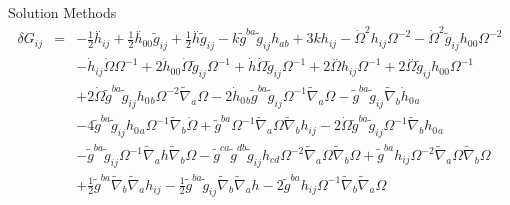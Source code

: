 \documentclass[8pt,aspectratio=1610]{beamer}
\begin{document}

\begin{frame}{Solution Methods}
	\begin{eqnarray}
		\delta G_{ij} &=& - \tfrac{1}{2} \overset{..}{h}_{ij} + \tfrac{1}{2} \overset{..}{h}_{00}{} \tilde{g}_{ij} + \tfrac{1}{2} \overset{..}{h} \tilde{g}_{ij} -  k \tilde{g}^{ba} \tilde{g}_{ij} h_{ab} + 3 k h_{ij} -  \dot{\Omega}^2 h_{ij} \Omega^{-2} -  \dot{\Omega}^2 \tilde{g}_{ij} h_{00}{} \Omega^{-2} 
		\nonumber\\
		&& -  \dot{h}_{ij} \dot{\Omega} \Omega^{-1}  + 2 \dot{h}_{00}{} \dot{\Omega} \tilde{g}_{ij} \Omega^{-1} + \dot{h} \dot{\Omega} \tilde{g}_{ij} \Omega^{-1} + 2 \overset{..}{\Omega} h_{ij} \Omega^{-1} + 2 \overset{..}{\Omega} \tilde{g}_{ij} h_{00}{} \Omega^{-1} 
		\nonumber\\
		&& + 2 \dot{\Omega} \tilde{g}^{ba} \tilde{g}_{ij} h_{0}{}_{b} \Omega^{-2} \tilde{\nabla}_{a}\Omega  - 2 \dot{h}_{0}{}_{b} \tilde{g}^{ba} \tilde{g}_{ij} \Omega^{-1} \tilde{\nabla}_{a}\Omega -  \tilde{g}^{ba} \tilde{g}_{ij} \tilde{\nabla}_{b}\dot{h}_{0}{}_{a} 
		\nonumber\\
		&& - 4 \tilde{g}^{ba} \tilde{g}_{ij} h_{0}{}_{a} \Omega^{-1} \tilde{\nabla}_{b}\dot{\Omega} + \tilde{g}^{ba} \Omega^{-1} \tilde{\nabla}_{a}\Omega \tilde{\nabla}_{b}h_{ij} - 2 \dot{\Omega} \tilde{g}^{ba} \tilde{g}_{ij} \Omega^{-1} \tilde{\nabla}_{b}h_{0}{}_{a}
		\nonumber\\
		&&  -  \tilde{g}^{ba} \tilde{g}_{ij} \Omega^{-1} \tilde{\nabla}_{a}h \tilde{\nabla}_{b}\Omega -  \tilde{g}^{ca} \tilde{g}^{db} \tilde{g}_{ij} h_{cd} \Omega^{-2} \tilde{\nabla}_{a}\Omega \tilde{\nabla}_{b}\Omega  + \tilde{g}^{ba} h_{ij} \Omega^{-2} \tilde{\nabla}_{a}\Omega \tilde{\nabla}_{b}\Omega 
		\nonumber\\
		&&+ \tfrac{1}{2} \tilde{g}^{ba} \tilde{\nabla}_{b}\tilde{\nabla}_{a}h_{ij} -  \tfrac{1}{2} \tilde{g}^{ba} \tilde{g}_{ij} \tilde{\nabla}_{b}\tilde{\nabla}_{a}h - 2 \tilde{g}^{ba} h_{ij} \Omega^{-1} \tilde{\nabla}_{b}\tilde{\nabla}_{a}\Omega  

\end{eqnarray}
\end{frame}
\end{document}
